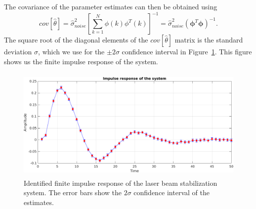 The covariance of the parameter estimates can then be obtained using
\begin{equation}\label{eq:cov}
	cov[\hat{\theta}] = \hat{\sigma}_{noise}^2 \left[ \sum\limits_{k=1}^N \phi(k)\phi^T(k) \right]^{-1} = \hat{\sigma}_{noise}^2 \left( \pmb{\phi}^T \pmb{\phi} \right)^{-1} .
\end{equation}
The square root of the diagonal elements of the $cov[\hat{\theta}]$ matrix is the standard deviation $ \sigma $, which we use for the $ \pm 2 \sigma $ confidence interval in Figure~\ref{fig:fir_response}. This figure shows us the finite impulse response of the system.
\begin{figure}[h]
	\centering
	\includegraphics[height=5.5cm]{figures/fir_response.pdf}
	\caption{Identified finite impulse response of the laser beam stabilization system. The error bars show the $2\sigma$ confidence interval of the estimates.}\label{fig:fir_response}
\end{figure}

